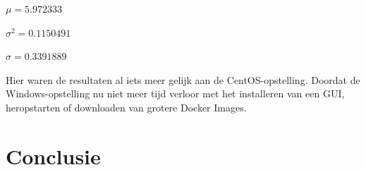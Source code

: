 $\mu = 5.972333$

$\sigma^2 = 0.1150491$

$\sigma = 0.3391889$

Hier waren de resultaten al iets meer gelijk aan de CentOS-opstelling. Doordat de Windows-opstelling nu niet meer tijd verloor met het installeren van een GUI, heropstarten of downloaden van grotere Docker Images.

\section{Conclusie}
